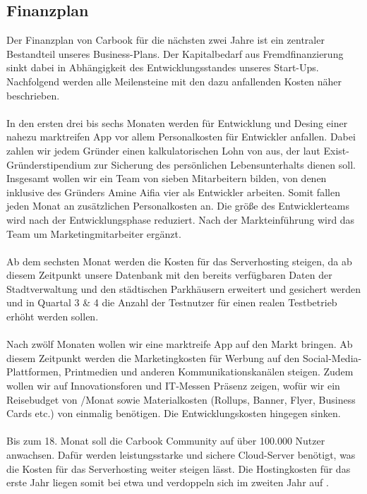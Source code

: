 \documentclass[12pt,ngerman, fleqn]{book} %
\begin{document}
\subsection{Finanzplan}
Der Finanzplan von Carbook für die nächsten zwei Jahre ist ein zentraler Bestandteil unseres Business-Plans. Der Kapitalbedarf aus Fremdfinanzierung sinkt dabei in Abhängigkeit des Entwicklungsstandes unseres Start-Ups. Nachfolgend werden alle Meilensteine mit den dazu anfallenden Kosten näher beschrieben. \\ \\
In den ersten drei bis sechs Monaten werden für Entwicklung und Desing einer nahezu marktreifen App vor allem Personalkosten für Entwickler anfallen. Dabei zahlen wir jedem Gründer einen kalkulatorischen Lohn von  aus, der laut Exist-Gründerstipendium zur Sicherung des persönlichen Lebensunterhalts dienen soll\autocite{existlohn}. Insgesamt wollen wir ein Team von sieben Mitarbeitern bilden, von denen inklusive des Gründers Amine Aifia vier als Entwickler arbeiten. Somit fallen jeden Monat  an zusätzlichen Personalkosten an. Die größe des Entwicklerteams wird nach der Entwicklungsphase reduziert. Nach der Markteinführung wird das Team um Marketingmitarbeiter ergänzt.\\ \\
Ab dem sechsten Monat werden die Kosten für das Serverhosting steigen, da ab diesem Zeitpunkt unsere Datenbank mit den bereits verfügbaren Daten der Stadtverwaltung und den städtischen Parkhäusern erweitert und gesichert werden und in Quartal 3 \& 4 die Anzahl der Testnutzer für einen realen Testbetrieb erhöht werden sollen.\\ \\
Nach zwölf Monaten wollen wir eine marktreife App auf den Markt bringen. Ab diesem Zeitpunkt werden die Marketingkosten für Werbung auf den Social-Media-Plattformen, Printmedien und anderen Kommunikationskanälen steigen. Zudem wollen wir auf Innovationsforen und IT-Messen Präsenz zeigen, wofür wir ein Reisebudget von /Monat sowie Materialkosten (Rollups, Banner, Flyer, Business Cards etc.) von einmalig  benötigen. Die Entwicklungskosten hingegen sinken.\\ \\
Bis zum 18. Monat soll die Carbook Community auf über 100.000 Nutzer anwachsen. Dafür werden leistungsstarke und sichere Cloud-Server benötigt, was die Kosten für das Serverhosting weiter steigen lässt. Die Hostingkosten für das erste Jahr liegen somit bei etwa  und verdoppeln sich im zweiten Jahr auf .
\end{document}
